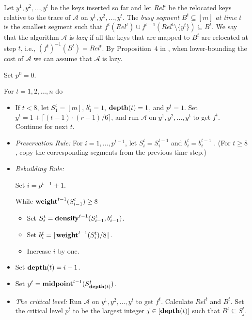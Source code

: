 \documentclass[runningheads,a4paper]{llncs}
\newcommand{\A}{\mathcal{A}}
\newcommand{\weight}{{\rm {\bf weight}}}
\newcommand{\midp}{{\rm {\bf midpoint}}}
\newcommand{\depth}{{\rm {\bf depth}}}
\newcommand{\densify}{{\rm {\bf densify}}}
\begin{document}
Let $y^1,y^2,\dots,y^t$ be the keys inserted so far and let $Rel^t$ be the relocated keys relative to 
the trace of $\A$ on $y^1,y^2,\dots,y^t$. The \emph{busy segment $B^t\subseteq [m]$ at time $t$} is
the smallest segment such that $f^t(Rel^t)\cup f^{t-1}(Rel^t \setminus \{y^t\}) \subseteq B^t$. 
We say that the algorithm $\A$ is \emph{lazy} if
all the keys that are mapped to $B^t$ are relocated at step $t$, i.e., $(f^t)^{-1}(B^t) = Rel^t$. 
By Proposition~4 in \cite{BKS}, when lower-bounding the cost of $\A$ 
we can assume that $\A$ is lazy.

\medskip\noindent {\bf Adversary($\A,n,m,r$)}

\smallskip\noindent Set $p^0=0$.

\smallskip\noindent For $t=1,2,\dots,n$ do
\begin{itemize}
\item
If $t < 8$, let $S^t_1 = [m]$, $b^t_1=1$, $\depth(t)=1$, and $p^{t}=1$.   
Set $y^t = 1 + \lceil (t-1) \cdot (r-1)/6 \rceil$, and run $\A$ on $y^1,y^2,\dots,y^t$ to get $f^t$.
Continue for next $t$.

\item
\emph{Preservation Rule:}
For $i=1,\dots,p^{t-1}$, let $S^t_i=S^{t-1}_{i}$ and $b^t_i=b^{t-1}_i$ . 
(For $t\ge 8$, copy the corresponding segments from the previous time step.)

\item 
\emph{Rebuilding Rule:}

Set $i=p^{t-1}+1$.

While $\weight^{t-1}(S^t_{i-1}) \ge 8$

\begin{itemize}
\item Set $S^t_i = \densify^{t-1}(S^t_{i-1},b^t_{i-1})$.
\item Set $b^t_i = \lceil \weight^{t-1}(S^t_i)/8 \rceil$.
\item Increase $i$ by one.
\end{itemize}

\item
Set $\depth(t)=i-1$.

\item 
Set $y^t = \midp^{t-1}(S^t_{\depth(t)})$.

\item
\emph{The critical level:}
Run $\A$ on $y^1,y^2,\dots,y^t$ to get $f^t$. Calculate $Rel^t$ and $B^t$.
Set the critical level $p^{t}$ to be the largest integer $j\in [\depth(t)]$ such that $B^{t} \subseteq S^{t}_j$.

\end{itemize}
\end{document}
